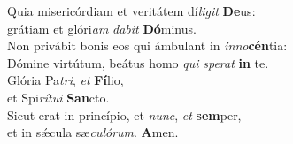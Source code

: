 \evenverse Quia misericórdiam et veritátem dí\textit{li}\textit{git} \textbf{De}us:~\*\\
\evenverse grátiam et glóri\textit{am} \textit{da}\textit{bit} \textbf{Dó}minus.\\
\oddverse Non privábit bonis eos qui ámbulant in \textit{in}\textit{no}\textbf{cén}tia:~\*\\
\oddverse Dómine virtútum, beátus homo \textit{qui} \textit{spe}\textit{rat} \textbf{in} te.\\
\evenverse Glória Pa\textit{tri}, \textit{et} \textbf{Fí}lio,~\*\\
\evenverse et Spi\textit{rí}\textit{tu}\textit{i} \textbf{San}cto.\\
\oddverse Sicut erat in princípio, et \textit{nunc}, \textit{et} \textbf{sem}per,~\*\\
\oddverse et in sǽcula sæ\textit{cu}\textit{ló}\textit{rum}. \textbf{A}men.\\
